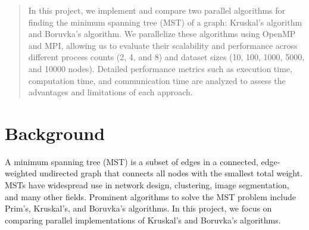 \documentclass[a4paper, 12pt]{article}
\begin{document}
\begin{titlepage}
\tableofcontents  %
\end{titlepage}

\begin{abstract}
In this project, we implement and compare two parallel algorithms for finding the 
minimum spanning tree (MST) of a graph: Kruskal’s algorithm and Boruvka’s algorithm. 
We parallelize these algorithms using OpenMP and MPI, allowing us to evaluate their 
scalability and performance across different process counts (2, 4, and 8) and dataset 
sizes (10, 100, 1000, 5000, and 10000 nodes). Detailed performance metrics such as 
execution time, computation time, and communication time are analyzed to assess the 
advantages and limitations of each approach.
\end{abstract}

\section{Background}
A minimum spanning tree (MST) is a subset of edges in a connected, edge-weighted undirected 
graph that connects all nodes with the smallest total weight. MSTs have widespread use in network 
design, clustering, image segmentation, and many other fields. Prominent algorithms to solve the MST 
problem include Prim’s, Kruskal’s, and Boruvka’s algorithms. In this project, we focus on comparing 
parallel implementations of Kruskal’s and Boruvka’s algorithms.

\end{document}
